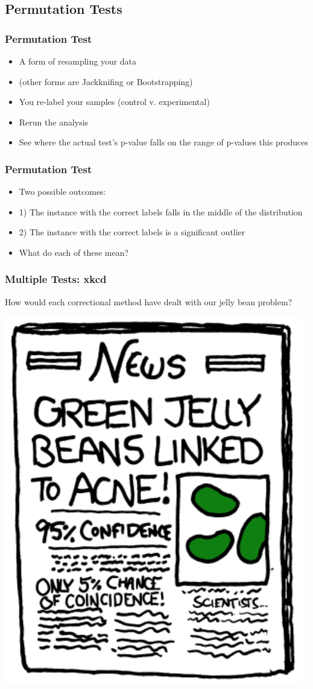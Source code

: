 \documentclass[14pt,handout]{beamer}
\begin{document}
\subsection{Permutation Tests}

\begin{frame}
\frametitle{Permutation Test}
\begin{itemize}
	\item<+-> A form of resampling your data
	\item<+-> (other forms are Jackknifing or Bootstrapping)
	\item<+-> You re-label your samples (control v. experimental)
	\item<+-> Rerun the analysis
	\item<+-> See where the actual test's p-value falls on the range of p-values this produces
\end{itemize}
\end{frame}

\begin{frame}
\frametitle{Permutation Test}
\begin{itemize}
	\item<+-> Two possible outcomes:
	\item<+-> 1) The instance with the correct labels falls in the middle of the distribution
	\item<+-> 2) The instance with the correct labels is a significant outlier
	\item<+-> What do each of these mean?
\end{itemize}
\end{frame}

\begin{frame}
\frametitle{Multiple Tests: xkcd}
How would each correctional method have dealt with our jelly bean problem?
\begin{center}
	\includegraphics[width=.6\textwidth]{images_20171128_xkcd_pval3.png}
\end{center}
\end{frame}
\end{document}
